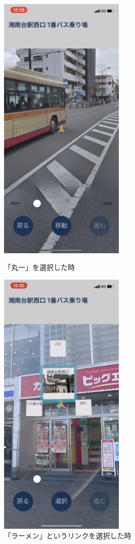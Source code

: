 \begin{figure}[h]
  \begin{minipage}{0.5\hsize}
    \centering
    \includegraphics[width=60mm]{images/shonandai_bus_moved.png}
    \caption{「丸一」を選択した時} \label{fig:shonandai_bus_moved}
  \end{minipage}
  \begin{minipage}{0.5\hsize}
    \centering
    \includegraphics[width=60mm]{images/shonandai_bus2.png}
    \caption{「ラーメン」というリンクを選択した時} \label{fig:shonandai_bus2}
  \end{minipage}
\end{figure}


